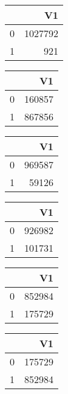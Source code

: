 \bigskip\bigskip
\centering
\begin{tabular}{rr}
  \hline
 & V1 \\ 
  \hline
0 & 1027792 \\ 
  1 & 921 \\ 
   \hline
\end{tabular}

\bigskip\bigskip
\centering
\begin{tabular}{rr}
  \hline
 & V1 \\ 
  \hline
0 & 160857 \\ 
  1 & 867856 \\ 
   \hline
\end{tabular}

\bigskip\bigskip
\centering
\begin{tabular}{rr}
  \hline
 & V1 \\ 
  \hline
0 & 969587 \\ 
  1 & 59126 \\ 
   \hline
\end{tabular}

\bigskip\bigskip
\centering
\begin{tabular}{rr}
  \hline
 & V1 \\ 
  \hline
0 & 926982 \\ 
  1 & 101731 \\ 
   \hline
\end{tabular}

\bigskip\bigskip
\centering
\begin{tabular}{rr}
  \hline
 & V1 \\ 
  \hline
0 & 852984 \\ 
  1 & 175729 \\ 
   \hline
\end{tabular}

\bigskip\bigskip
\centering
\begin{tabular}{rr}
  \hline
 & V1 \\ 
  \hline
0 & 175729 \\ 
  1 & 852984 \\ 
   \hline
\end{tabular}

